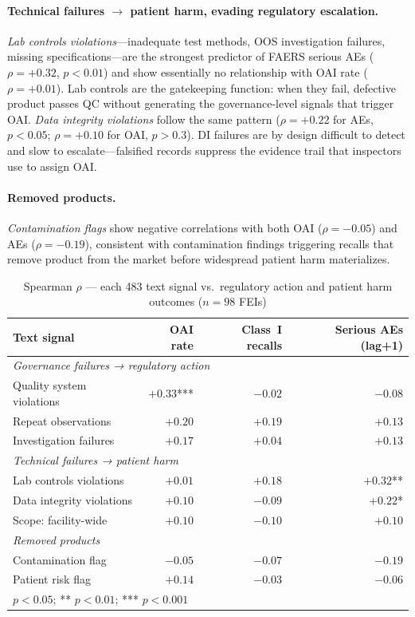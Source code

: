 \documentclass[12pt]{article}
\begin{document}
\paragraph{Technical failures $\to$ patient harm, evading regulatory escalation.}
\emph{Lab controls violations}---inadequate test methods, OOS investigation
failures, missing specifications---are the strongest predictor of FAERS
serious AEs ($\rho = +0.32$, $p < 0.01$) and show essentially no relationship
with OAI rate ($\rho = +0.01$).
Lab controls are the gatekeeping function: when they fail, defective product
passes QC without generating the governance-level signals that trigger OAI.
\emph{Data integrity violations} follow the same pattern ($\rho = +0.22$ for
AEs, $p < 0.05$; $\rho = +0.10$ for OAI, $p > 0.3$).
DI failures are by design difficult to detect and slow to escalate---falsified
records suppress the evidence trail that inspectors use to assign OAI.

\paragraph{Removed products.}
\emph{Contamination flags} show negative correlations with both OAI
($\rho = -0.05$) and AEs ($\rho = -0.19$), consistent with contamination
findings triggering recalls that remove product from the market before
widespread patient harm materializes.

\begin{table}[h!]
\centering
\small
\caption{Spearman $\rho$ — each 483 text signal vs.\ regulatory action and
         patient harm outcomes ($n = 98$ FEIs)}
\label{tab:two_modes}
\begin{tabular}{lrrr}
\toprule
\textbf{Text signal} & \textbf{OAI rate} & \textbf{Class~I recalls}
                     & \textbf{Serious AEs (lag+1)} \\
\midrule
\multicolumn{4}{l}{\textit{Governance failures → regulatory action}} \\
\quad Quality system violations & $+0.33$*** & $-0.02$ & $-0.08$ \\
\quad Repeat observations       & $+0.20$    & $+0.19$ & $+0.13$ \\
\quad Investigation failures    & $+0.17$    & $+0.04$ & $+0.13$ \\
\midrule
\multicolumn{4}{l}{\textit{Technical failures → patient harm}} \\
\quad Lab controls violations   & $+0.01$    & $+0.18$ & $+0.32$** \\
\quad Data integrity violations & $+0.10$    & $-0.09$ & $+0.22$* \\
\quad Scope: facility-wide      & $+0.10$    & $-0.10$ & $+0.10$ \\
\midrule
\multicolumn{4}{l}{\textit{Removed products}} \\
\quad Contamination flag        & $-0.05$    & $-0.07$ & $-0.19$ \\
\quad Patient risk flag         & $+0.14$    & $-0.03$ & $-0.06$ \\
\bottomrule
\multicolumn{4}{l}{\footnotesize * $p<0.05$; ** $p<0.01$; *** $p<0.001$} \\
\end{tabular}
\end{table}
\end{document}
